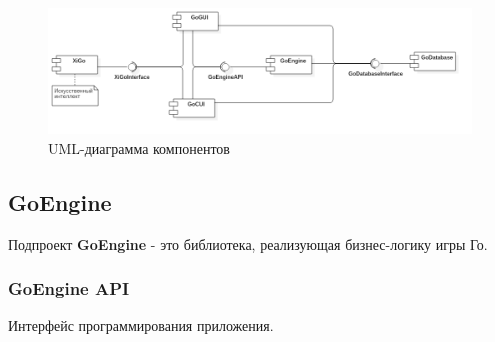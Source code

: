 \begin{figure}[H]
	\begin{center}
		\includegraphics[scale=0.49]{../UMLdiagrams/Component/Component.png}
		\caption{UML-диаграмма компонентов} 
		\label{pic:Component}
	\end{center}
\end{figure}


\subsection*{GoEngine}

Подпроект \textbf{GoEngine} - это библиотека, реализующая бизнес-логику игры Го.

\subsubsection*{GoEngine API}

Интерфейс программирования приложения.\\

